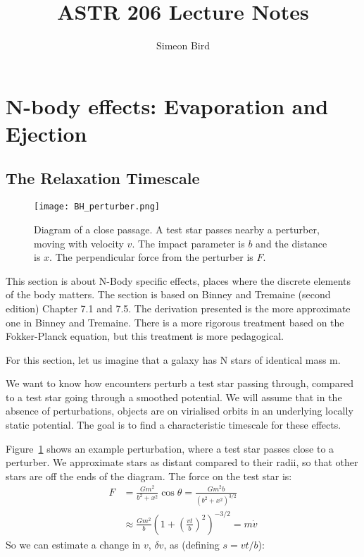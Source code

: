 \documentclass[12pt]{article}
\title{ASTR 206 Lecture Notes}
\author{Simeon Bird}
\begin{document}
\maketitle

\section{N-body effects: Evaporation and Ejection}
\subsection{The Relaxation Timescale}
\begin{figure}
\texttt{[image: BH\_perturber.png]}
\centering
\caption{Diagram of a close passage. A test star passes nearby a perturber, moving with velocity $v$. The impact parameter is $b$ and the distance is $x$. The perpendicular force from the perturber is $F$.}
\label{fig:close}
\end{figure}

This section is about N-Body specific effects, places where the discrete elements of the body matters. The section is based on Binney and Tremaine (second edition) Chapter 7.1 and 7.5. The derivation presented is the more approximate one in Binney and Tremaine. There is a more rigorous treatment based on the Fokker-Planck equation, but this treatment is more pedagogical.

For this section, let us imagine that a galaxy has N stars of identical mass m.

We want to know how encounters perturb a test star passing through, compared to a test star going through a smoothed potential. We will assume that in the absence of perturbations, objects are on virialised orbits in an underlying locally static potential. The goal is to find a characteristic timescale for these effects.


Figure~\ref{fig:close} shows an example perturbation, where a test star passes close to a perturber. We approximate stars as distant compared to their radii, so that other stars are off the ends of the diagram. The force on the test star is:
\begin{align}
 F &= \frac{G m^2}{b^2 + x^2} \cos \theta = \frac{G m^2 b}{(b^2 + x^2)^{3/2}} \\
 &\approx \frac{Gm^2}{b} \left( 1 + \left(\frac{v t}{b}\right)^2\right)^{-3/2} = m \dot{v}
\end{align}
So we can estimate a change in $v$, $\delta v$, as (defining $s = v t / b$):
\end{document}
